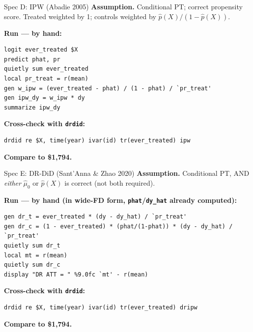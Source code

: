 \documentclass[11pt,aspectratio=169]{beamer}
\begin{document}
\begin{frame}[fragile]{Spec D: IPW (Abadie 2005)}
\textbf{Assumption.} \;Conditional PT; correct propensity score. \;Treated weighted by 1; controls weighted by $\hat p(X)/(1-\hat p(X))$.
\vspace{0.3em}

\textbf{Run --- by hand:}
\begin{lstlisting}[language={[ANSI]C},basicstyle=\ttfamily\scriptsize]
logit ever_treated $X
predict phat, pr
quietly sum ever_treated
local pr_treat = r(mean)
gen w_ipw = (ever_treated - phat) / (1 - phat) / `pr_treat'
gen ipw_dy = w_ipw * dy
summarize ipw_dy
\end{lstlisting}

\textbf{Cross-check with \texttt{drdid}:}
\begin{lstlisting}[language={[ANSI]C},basicstyle=\ttfamily\footnotesize]
drdid re $X, time(year) ivar(id) tr(ever_treated) ipw
\end{lstlisting}

\textbf{Compare to \$1,794.}
\end{frame}

\begin{frame}[fragile]{Spec E: DR-DiD (Sant'Anna \& Zhao 2020)}
\textbf{Assumption.} \;Conditional PT, AND \textit{either} $\hat\mu_0$ or $\hat p(X)$ is correct (not both required).
\vspace{0.3em}

\textbf{Run --- by hand (in wide-FD form, \texttt{phat}/\texttt{dy\_hat} already computed):}
\begin{lstlisting}[language={[ANSI]C},basicstyle=\ttfamily\scriptsize]
gen dr_t = ever_treated * (dy - dy_hat) / `pr_treat'
gen dr_c = (1 - ever_treated) * (phat/(1-phat)) * (dy - dy_hat) / `pr_treat'
quietly sum dr_t
local mt = r(mean)
quietly sum dr_c
display "DR ATT = " %9.0fc `mt' - r(mean)
\end{lstlisting}

\textbf{Cross-check with \texttt{drdid}:}
\begin{lstlisting}[language={[ANSI]C},basicstyle=\ttfamily\footnotesize]
drdid re $X, time(year) ivar(id) tr(ever_treated) dripw
\end{lstlisting}

\textbf{Compare to \$1,794.}
\end{frame}

\end{document}
